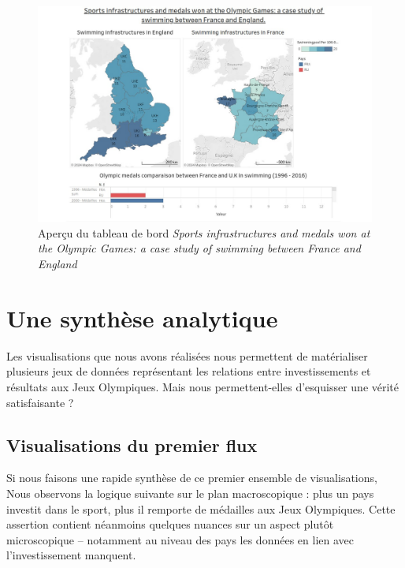 \documentclass[hidelinks, 12pt]{report}
\begin{document}
\begin{center}
	\begin{figure}[H]
		\centering
		\setlength{\belowcaptionskip}{-35pt}
		\includegraphics[scale=0.35]{images/datavis-swim-tab.jpeg}
		\captionsetup{justification=centering}
		\caption{Aperçu du tableau de bord \textit{Sports infrastructures and medals won at the Olympic Games: a case study of swimming between France and England}}
	\end{figure}
\end{center}





%





\section{Une synthèse analytique}

Les visualisations que nous avons réalisées nous permettent de matérialiser plusieurs jeux de données représentant les relations entre investissements et résultats aux Jeux Olympiques. Mais nous permettent-elles d’esquisser une vérité satisfaisante ?

\subsection{Visualisations du premier flux}

\label{nuance}Si nous faisons une rapide synthèse de ce premier ensemble de visualisations, Nous observons la logique suivante sur le plan macroscopique : plus un pays investit dans le sport, plus il remporte de médailles aux Jeux Olympiques. Cette assertion contient néanmoins quelques nuances sur un aspect plutôt microscopique -- notamment au niveau des pays les données en lien avec l’investissement manquent.
\end{document}
